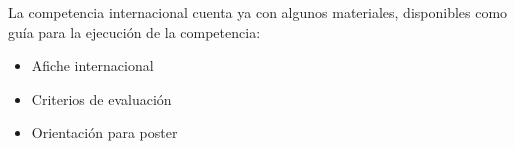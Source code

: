 \documentclass{article}
\begin{document}
\begin{figure}[!htp]
\label{poster}
\end{figure}

La competencia internacional cuenta ya con algunos materiales, disponibles como guía para la ejecución de la competencia:

\begin{itemize}
\item Afiche internacional
\item Criterios de evaluación
\item Orientación para poster
\end{itemize}






\end{document}
